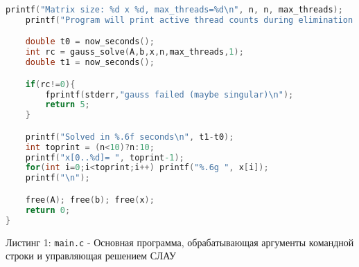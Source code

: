 \begin{lstlisting}[language=C]
    printf("Matrix size: %d x %d, max_threads=%d\n", n, n, max_threads);
    printf("Program will print active thread counts during elimination.\n");

    double t0 = now_seconds();
    int rc = gauss_solve(A,b,x,n,max_threads,1);
    double t1 = now_seconds();

    if(rc!=0){
        fprintf(stderr,"gauss failed (maybe singular)\n");
        return 5;
    }

    printf("Solved in %.6f seconds\n", t1-t0);
    int toprint = (n<10)?n:10;
    printf("x[0..%d]= ", toprint-1);
    for(int i=0;i<toprint;i++) printf("%.6g ", x[i]);
    printf("\n");

    free(A); free(b); free(x);
    return 0;
}
\end{lstlisting}
Листинг 1: \texttt{main.c} - Основная программа, обрабатывающая аргументы командной строки и управляющая решением СЛАУ

